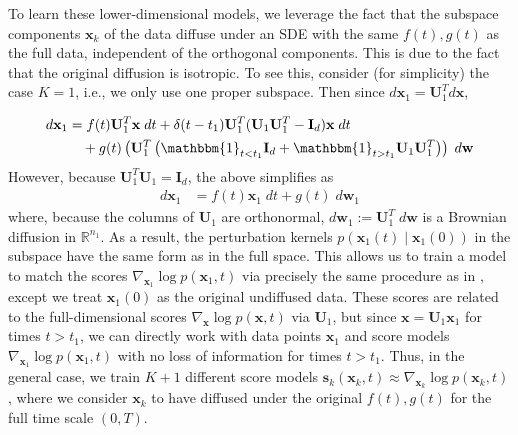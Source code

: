 \documentclass{article}
\begin{document}
To learn these lower-dimensional models, we leverage the fact that the subspace components $\mathbf{x}_k$ of the data diffuse under an SDE with the same $f(t), g(t)$ as the full data, independent of the orthogonal components. This is due to the fact that the original diffusion is isotropic. To see this, consider (for simplicity) the case $K=1$, i.e., we only use one proper subspace. Then since $ d\mathbf{x}_1 = \mathbf{U}_1^Td\mathbf{x}$,

\begin{equation}
\begin{aligned}
    d\mathbf{x}_1 &= f(t)\mathbf{U}_1^T\mathbf{x} \; dt + \delta(t-t_1)\mathbf{U}_1^T(\mathbf{U}_1\mathbf{U}_1^T - \mathbf{I}_d)\mathbf{x} \; dt \\
    &\quad + g(t)\left(\mathbf{U}_1^T\left(\mathbbm{1}_{t < t_1}\mathbf{I}_d + \mathbbm{1}_{t > t_1}\mathbf{U}_1\mathbf{U}_1^T\right)\right) \; d\mathbf{w}
\end{aligned}
\end{equation}
However, because $\mathbf{U}_1^T\mathbf{U}_1 = \mathbf{I}_d$, the above simplifies as
\begin{equation}
\begin{aligned}
    d\mathbf{x}_1 
    &= f(t)\mathbf{x}_1 \; dt + g(t) \; d\mathbf{w}_1
\end{aligned}
\end{equation}
where, because the columns of $\mathbf{U}_1$ are orthonormal, $d\mathbf{w}_1 := \mathbf{U}_1^T \; d\mathbf{w}$ is a Brownian diffusion in $\mathbb{R}^{n_1}$. As a result, the perturbation kernels $p(\mathbf{x}_1(t) \mid \mathbf{x}_1(0))$ in the subspace have the same form as in the full space. This allows us to train a model to match the scores $\nabla_{\mathbf{x}_1} \log p(\mathbf{x}_1, t)$ via precisely the same procedure as in \cite{song2021score}, except we treat $\mathbf{x}_1(0)$ as the original undiffused data. These scores are related to the full-dimensional scores $\nabla_\mathbf{x} \log p(\mathbf{x}, t)$ via $\mathbf{U}_1$, but since $\mathbf{x} = \mathbf{U}_1\mathbf{x}_1$ for times $t > t_1$, we can directly work with data points $\mathbf{x}_1$ and score models $\nabla_{\mathbf{x}_1} \log p(\mathbf{x}_1, t)$ with no loss of information for times $t>t_1$. Thus, in the general case, we train $K+1$ different score models $\mathbf{s}_k(\mathbf{x}_k, t) \approx \nabla_{\mathbf{x}_k} \log p(\mathbf{x}_k, t)$, where we consider $\mathbf{x}_k$ to have diffused under the original $f(t), g(t)$ for the full time scale $(0, T)$.
\end{document}
